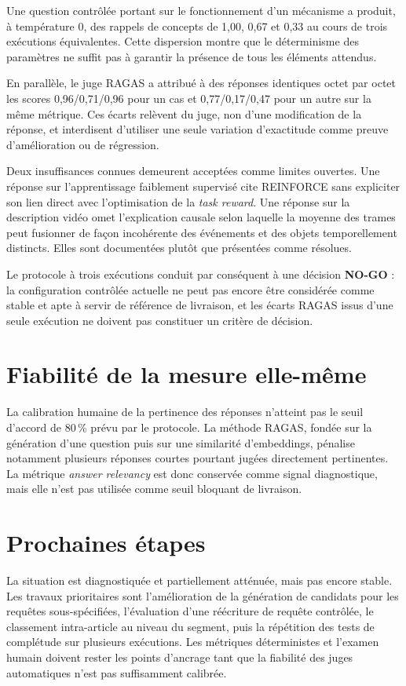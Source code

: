 Une question contrôlée portant sur le fonctionnement d'un mécanisme a produit,
à température 0, des rappels de concepts de 1,00, 0,67 et 0,33 au cours de trois
exécutions équivalentes. Cette dispersion montre que le déterminisme des paramètres
ne suffit pas à garantir la présence de tous les éléments attendus.

En parallèle, le juge RAGAS a attribué à des réponses identiques octet par octet
les scores 0,96/0,71/0,96 pour un cas et 0,77/0,17/0,47 pour un autre sur la
même métrique. Ces écarts relèvent du juge, non d'une modification de la réponse,
et interdisent d'utiliser une seule variation d'exactitude comme preuve
d'amélioration ou de régression.

Deux insuffisances connues demeurent acceptées comme limites ouvertes. Une réponse
sur l'apprentissage faiblement supervisé cite REINFORCE sans expliciter son lien
direct avec l'optimisation de la \emph{task reward}. Une réponse sur la description
vidéo omet l'explication causale selon laquelle la moyenne des trames peut fusionner
de façon incohérente des événements et des objets temporellement distincts. Elles
sont documentées plutôt que présentées comme résolues.

Le protocole à trois exécutions conduit par conséquent à une décision
\textbf{NO-GO} : la configuration contrôlée actuelle ne peut pas encore être
considérée comme stable et apte à servir de référence de livraison, et les écarts
RAGAS issus d'une seule exécution ne doivent pas constituer un critère de décision.

\section{Fiabilité de la mesure elle-même}

La calibration humaine de la pertinence des réponses n'atteint pas le seuil
d'accord de 80\,\% prévu par le protocole. La méthode RAGAS, fondée sur la
génération d'une question puis sur une similarité d'embeddings, pénalise notamment
plusieurs réponses courtes pourtant jugées directement pertinentes. La métrique
\emph{answer relevancy} est donc conservée comme signal diagnostique, mais elle
n'est pas utilisée comme seuil bloquant de livraison.

\section{Prochaines étapes}

La situation est diagnostiquée et partiellement atténuée, mais pas encore stable.
Les travaux prioritaires sont l'amélioration de la génération de candidats pour
les requêtes sous-spécifiées, l'évaluation d'une réécriture de requête contrôlée,
le classement intra-article au niveau du segment, puis la répétition des tests de
complétude sur plusieurs exécutions. Les métriques déterministes et l'examen humain
doivent rester les points d'ancrage tant que la fiabilité des juges automatiques
n'est pas suffisamment calibrée.

